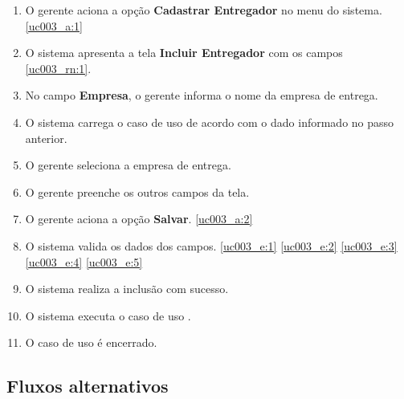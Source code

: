 \begin{enumerate}[label=P\arabic*]
	\item O gerente aciona a opção \textbf{Cadastrar Entregador} no menu do sistema. \ref{uc003_a:1}
	\item O sistema apresenta a tela \textbf{Incluir Entregador} com os campos \ref{uc003_rn:1}. \label{uc003_p:2}
	\item No campo \textbf{Empresa}, o gerente informa o nome da empresa de entrega.
	\item O sistema carrega o caso de uso  de acordo com o dado informado no passo anterior.
	\item O gerente seleciona a empresa de entrega. \label{uc003_p:5}
	\item O gerente preenche os outros campos da tela.	
	\item O gerente aciona a opção \textbf{Salvar}. \label{uc003_p:7} \ref{uc003_a:2}
	\item O sistema valida os dados dos campos. \ref{uc003_e:1} \ref{uc003_e:2} \ref{uc003_e:3} \ref{uc003_e:4} \ref{uc003_e:5}
	\item O sistema realiza a inclusão com sucesso.
	\item O sistema executa o caso de uso .
	\item O caso de uso é encerrado.	
\end{enumerate}

\subsection{Fluxos alternativos}

